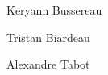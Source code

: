 
\begin{DoxyItemize}
\item Keryann Bussereau
\item Tristan Biardeau
\item Alexandre Tabot 
\end{DoxyItemize}
